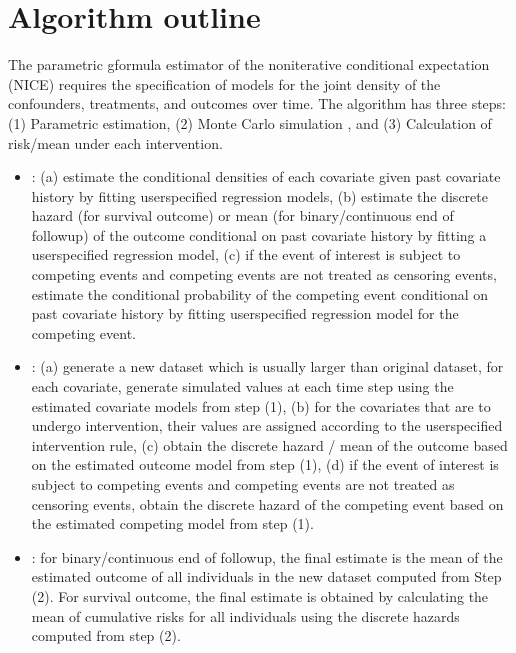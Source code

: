 \documentclass[letterpaper,10pt,english]{sphinxmanual}
\begin{document}
\section{Algorithm outline}
\label{\detokenize{Get Started:algorithm-outline}}
\sphinxAtStartPar
The parametric g\sphinxhyphen{}formula estimator of the noniterative conditional expectation (NICE) requires
the specification of models for the joint density of the confounders, treatments, and outcomes over time.
The algorithm has three steps: (1) Parametric estimation, (2) Monte Carlo simulation
, and (3) Calculation of risk/mean under each intervention.
\begin{itemize}
\item {} 
\sphinxAtStartPar
{}: (a) estimate the conditional densities of each covariate given past covariate history
by fitting user\sphinxhyphen{}specified regression models, (b) estimate the discrete hazard (for survival outcome) or mean
(for binary/continuous end of follow\sphinxhyphen{}up) of the outcome conditional on past covariate history by fitting a user\sphinxhyphen{}specified
regression model, (c) if the event of interest is subject to competing events and competing events are not treated as censoring events, estimate the conditional probability of the competing event
conditional on past covariate history by fitting user\sphinxhyphen{}specified regression model for the competing event.

\item {} 
\sphinxAtStartPar
{}: (a) generate a new dataset which is usually larger than original dataset, for each covariate,
generate simulated values at each time step using the estimated covariate models from step (1), (b) for the
covariates that are to undergo intervention, their values are assigned according to the user\sphinxhyphen{}specified intervention rule,
(c) obtain the discrete hazard / mean of the outcome based on the estimated outcome model from step (1),
(d) if the event of interest is subject to competing events and competing events are not treated as censoring events,
obtain the discrete hazard of the competing event based on the estimated competing model from step (1).

\item {} 
\sphinxAtStartPar
{}: for binary/continuous end of follow\sphinxhyphen{}up, the final estimate is the mean of
the estimated outcome of all individuals in the new dataset computed from Step (2). For survival outcome,
the final estimate is obtained by calculating the mean of cumulative risks for all individuals using the discrete hazards computed from step (2).

\end{itemize}
\end{document}

